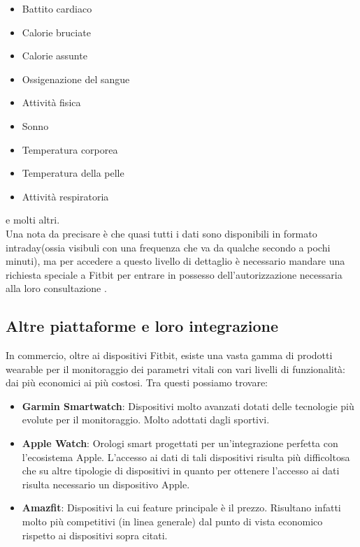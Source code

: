 \documentclass[12pt,a4paper,oneside]{report}
\begin{document}
\begin{itemize}
    \item Battito cardiaco
    \item Calorie bruciate
    \item Calorie assunte
    \item Ossigenazione del sangue
    \item Attività fisica
    \item Sonno
    \item Temperatura corporea
    \item Temperatura della pelle
    \item Attività respiratoria
\end{itemize}

e molti altri.
\\Una nota da precisare è che quasi tutti i dati sono disponibili in formato intraday(ossia visibuli con una frequenza che va da qualche secondo a pochi minuti), ma per accedere a questo livello di dettaglio è necessario mandare una richiesta speciale a Fitbit per entrare in possesso dell'autorizzazione necessaria alla loro consultazione \cite{fitbitapi}.

\subsection{Altre piattaforme e loro integrazione}

In commercio, oltre ai dispositivi Fitbit, esiste una vasta gamma di prodotti wearable per il monitoraggio dei parametri vitali con vari livelli di funzionalità: dai più economici ai più costosi. Tra questi possiamo trovare:

\begin{itemize}
    \item \textbf{Garmin Smartwatch}: Dispositivi molto avanzati dotati delle tecnologie più evolute per il monitoraggio. Molto adottati dagli sportivi. \cite{mysql}
    \item \textbf{Apple Watch}: Orologi smart progettati per un'integrazione perfetta con l'ecosistema Apple. L'accesso ai dati di tali dispositivi risulta più difficoltosa che su altre tipologie di dispositivi in quanto per ottenere l'accesso ai dati risulta necessario un dispositivo Apple. \cite{applewatch}
    \item \textbf{Amazfit}: Dispositivi la cui feature principale è il prezzo. Risultano infatti molto più competitivi (in linea generale) dal punto di vista economico rispetto ai dispositivi sopra citati. \cite{amazfit}
\end{itemize}
\end{document}

